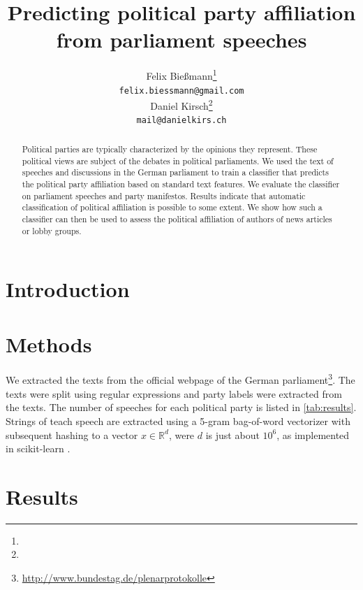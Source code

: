 \documentclass{article} %
\title{Predicting political party affiliation\\ from parliament speeches}
\author{
Felix Bie\ss{}mann\thanks{} \\
\texttt{felix.biessmann@gmail.com} \\
\And
Daniel Kirsch\thanks{}\\
\texttt{mail@danielkirs.ch} \\
}
\begin{document}
\maketitle

\begin{abstract}
Political parties are typically characterized by the opinions they represent. These political views are subject of the debates in political parliaments. We used the text of speeches and discussions in the German parliament to train a classifier that predicts the political party affiliation based on standard text features. We evaluate the classifier on parliament speeches and party manifestos. Results indicate that automatic classification of political affiliation is possible to some extent. We show how such a classifier can then be used to assess the political affiliation of authors of news articles or lobby groups. 
\end{abstract}

\section{Introduction}


\section{Methods}
We extracted the texts from the official webpage of the German parliament\footnote{\url{http://www.bundestag.de/plenarprotokolle}}. The texts were split using regular expressions and party labels were extracted from the texts. The number of speeches for each political party is listed in \autoref{tab:results}. Strings of teach speech are extracted using a 5-gram bag-of-word vectorizer with subsequent hashing to a vector $x\in\mathds{R}^d$, were $d$ is just about $10^6$, as implemented in scikit-learn \cite{scikit-learn}. 

\section{Results}
\end{document}
